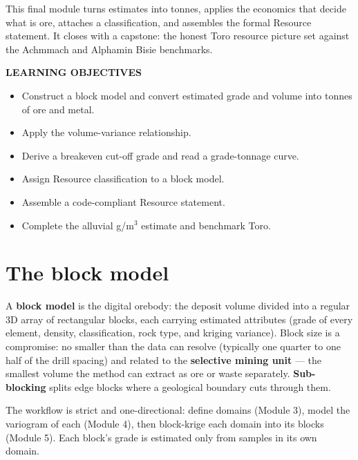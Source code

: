 \documentclass[11pt]{article}
\begin{document}

This final module turns estimates into tonnes, applies the economics
that decide what is ore, attaches a classification, and assembles the
formal Resource statement. It closes with a capstone: the honest Toro
resource picture set against the Achmmach and Alphamin Bisie benchmarks.

\begin{objbox}
{\sffamily\bfseries\color{bronze}LEARNING OBJECTIVES}
\begin{itemize}[leftmargin=14pt,itemsep=2pt]
\item Construct a block model and convert estimated grade and volume
into tonnes of ore and metal.
\item Apply the volume-variance relationship.
\item Derive a breakeven cut-off grade and read a grade-tonnage curve.
\item Assign Resource classification to a block model.
\item Assemble a code-compliant Resource statement.
\item Complete the alluvial g/m$^3$ estimate and benchmark Toro.
\end{itemize}
\end{objbox}

\section{The block model}

A \textbf{block model} is the digital orebody: the deposit volume
divided into a regular 3D array of rectangular blocks, each carrying
estimated attributes (grade of every element, density, classification,
rock type, and kriging variance). Block size is a compromise: no smaller
than the data can resolve (typically one quarter to one half of the
drill spacing) and related to the \textbf{selective mining unit} ---
the smallest volume the method can extract as ore or waste separately.
\textbf{Sub-blocking} splits edge blocks where a geological boundary
cuts through them.

\begin{keybox}
The workflow is strict and one-directional: define domains (Module 3),
model the variogram of each (Module 4), then block-krige each domain into
its blocks (Module 5). Each block's grade is estimated only from samples
in its own domain.
\end{keybox}
\end{document}
